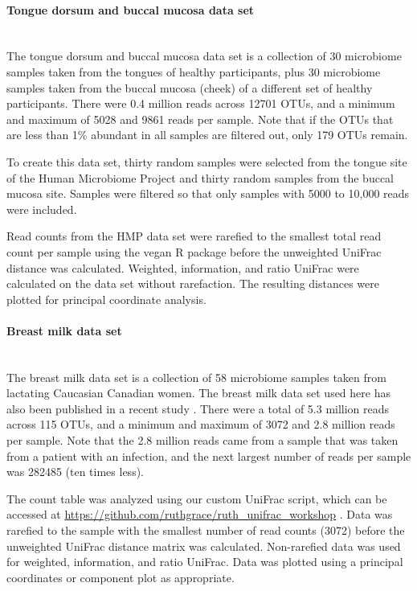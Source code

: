 \documentclass[10pt,letterpaper]{article}
\begin{document}
\paragraph{Tongue dorsum and buccal mucosa data set}\mbox{}\\
The tongue dorsum and buccal mucosa data set is a collection of 30 microbiome samples taken from the tongues of healthy participants, plus 30 microbiome samples taken from the buccal mucosa (cheek) of a different set of healthy participants. There were 0.4 million reads across 12701 OTUs, and a minimum and maximum of 5028 and 9861 reads per sample. Note that if the OTUs that are less than 1\% abundant in all samples are filtered out, only 179 OTUs remain.

To create this data set, thirty random samples were selected from the tongue site of the Human Microbiome Project \cite{turnbaugh2007human} and thirty random samples from the buccal mucosa site. Samples were filtered so that only samples with 5000 to 10,000 reads were included.

Read counts from the HMP data set were rarefied to the smallest total read count per sample using the vegan R package \cite{oksanen2007vegan} before the unweighted UniFrac distance was calculated. Weighted, information, and ratio UniFrac were calculated on the data set without rarefaction. The resulting distances were plotted for principal coordinate analysis.

\paragraph{Breast milk data set}\mbox{}\\
The breast milk data set is a collection of 58 microbiome samples taken from lactating Caucasian Canadian women. The breast milk data set used here has also been published in a recent study \cite{urbaniak2016human}. There were a total of 5.3 million reads across 115 OTUs, and a minimum and maximum of 3072 and 2.8 million reads per sample. Note that the 2.8 million reads came from a sample that was taken from a patient with an infection, and the next largest number of reads per sample was 282485 (ten times less).

The count table was analyzed using our custom UniFrac script, which can be accessed at \url{https://github.com/ruthgrace/ruth_unifrac_workshop} \cite{ruth_unifrac_workshop}. Data was rarefied to the sample with the smallest number of read counts (3072) before the unweighted UniFrac distance matrix was calculated. Non-rarefied data was used for weighted, information, and ratio UniFrac. Data was plotted using a principal coordinates or component plot as appropriate.
\end{document}
